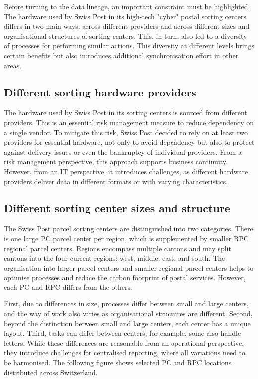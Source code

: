 Before turning to the data lineage, an important constraint must be highlighted. The hardware used by Swiss Post in its high-tech "cyber" postal sorting centers differs in two main ways: across different providers and across different sizes and organisational structures of sorting centers. This, in turn, also led to a diversity of processes for performing similar actions. This diversity at different levels brings certain benefits but also introduces additional synchronisation effort in other areas.



\subsection*{Different sorting hardware providers}
The hardware used by Swiss Post in its sorting centers is sourced from different providers. This is an essential risk management measure to reduce dependency on a single vendor. To mitigate this risk, Swiss Post decided to rely on at least two providers for essential hardware, not only to avoid dependency but also to protect against delivery issues or even the bankruptcy of individual providers. From a risk management perspective, this approach supports business continuity. However, from an IT perspective, it introduces challenges, as different hardware providers deliver data in different formats or with varying characteristics.

\subsection*{Different sorting center sizes and structure}
The Swiss Post parcel sorting centers are distinguished into two categories. There is one large \gls{PC} parcel center per \gls{region}, which is supplemented by smaller \gls{RPC} regional parcel centers. Regions encompass multiple cantons and may split cantons into the four current regions: west, middle, east, and south. The organisation into larger parcel centers and smaller regional parcel centers helps to optimise processes and reduce the carbon footprint of postal services. However, each PC and RPC differs from the others.

First, due to differences in size, processes differ between small and large centers, and the way of work also varies as organisational structures are different. Second, beyond the distinction between small and large centers, each center has a unique layout. Third, tasks can differ between centers; for example, some also handle letters. While these differences are reasonable from an operational perspective, they introduce challenges for centralised reporting, where all variations need to be harmonised. The following figure shows selected PC and RPC locations distributed across Switzerland.


